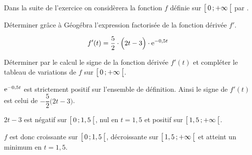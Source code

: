 \bigskip

Dans la suite de l'exercice on considèrera la fonction $f$ définie sur $\bigl[ \, 0 \, ; +\infty \,\bigl[$ par .

\begin{enumerate}[series=monDS, resume]
    \begin{minipage}{0.46\textwidth}
            \item Déterminer grâce à Géogébra l'expression factorisée de la fonction dérivée $f'$.

    \end{minipage}\hfill{}
    \begin{minipage}{0.48\textwidth}
\begin{blocvisiblex}[height=1.5]
    {\quad}

    \[f'(t)= \dfrac{5}{2}\cdot \Big(2t-3\Big)\cdot \mathrm{e}^{-0,5t}\]


    \end{blocvisiblex}
    \end{minipage}
    
    \medskip
    
    \item Déterminer par le calcul le signe de la fonction dérivée $f'(t)$ et compléter le tableau de variations de $f$ sur $\bigl[ \, 0 \, ; +\infty \,\bigl[$.
    \begin{blocvisiblex}[height=5.5]
    {
    \begin{minipage}{0.48\linewidth}
        \quad
    \end{minipage}\hfill{}
    \begin{minipage}{0.46\linewidth}
    \end{minipage}
    }
        \begin{minipage}{0.48\linewidth}
        $\mathrm{e}^{-0,5t}$ est strictement positif sur l'ensemble de définition. Ainsi le signe de $f'(t)$ est celui de $-\dfrac{5}{2}\big(2t-3\big)$.

        $2t-3$ est négatif sur $\bigl[ \, 0 \, ; 1,5 \,\bigl[$, nul en $t=1,5$ et positif sur $\bigl[ \, 1,5 \, ; +\infty \,\bigl[$.
    
        $f$ est donc croissante sur $\bigl[ \, 0 \, ; 1,5 \,\bigl[$, décroissante sur $\bigl[ \, 1,5 \, ; +\infty \,\bigl[$ et atteint un minimum en $t=1,5$.
    \end{minipage}\hfill{}
    \begin{minipage}{0.46\linewidth}
        \end{minipage}
\end{blocvisiblex}
\end{enumerate}

